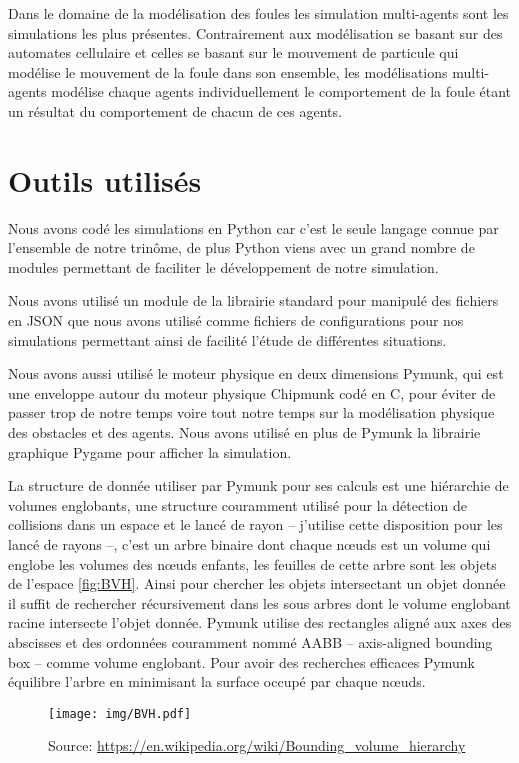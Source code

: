 \documentclass{article}
\newcommand{\source}[1]{\caption*{Source: #1}}
\begin{document}
Dans le domaine de la modélisation des foules les simulation multi-agents sont
les simulations les plus présentes. Contrairement aux modélisation se basant sur
des automates cellulaire et celles se basant sur le mouvement de particule
qui modélise le mouvement de la foule dans son ensemble, les modélisations
multi-agents modélise chaque agents individuellement le comportement de la foule
étant un résultat du comportement de chacun de ces agents.

\section{Outils utilisés}

Nous avons codé les simulations en Python car c'est le seule langage connue
par l'ensemble de notre trinôme, de plus Python viens avec un grand nombre
de modules permettant de faciliter le développement de notre simulation.

Nous avons utilisé un module de la librairie standard pour manipulé des
fichiers en JSON que nous avons utilisé comme
fichiers de configurations pour nos simulations permettant ainsi de facilité
l'étude de différentes situations.

Nous avons aussi utilisé le moteur physique en deux dimensions Pymunk,
qui est une enveloppe autour du moteur physique Chipmunk codé en C, pour
éviter de passer trop de notre temps voire tout notre temps sur la
modélisation physique des obstacles et des agents. Nous avons utilisé en
plus de Pymunk la librairie graphique Pygame pour afficher la simulation.

La structure de donnée utiliser par Pymunk pour ses calculs est une
hiérarchie de volumes englobants, une structure couramment utilisé pour la
détection de collisions dans un espace et le lancé de rayon -- j'utilise
cette disposition pour les lancé de rayons --,
c'est un arbre binaire dont chaque
nœuds est un volume qui englobe les volumes des nœuds enfants, les feuilles
de cette arbre sont les objets de l'espace \autoref{fig:BVH}. Ainsi pour chercher les
objets intersectant un objet donnée il suffit de rechercher récursivement
dans les sous arbres dont le volume englobant racine intersecte l'objet
donnée. Pymunk utilise des rectangles aligné aux axes des abscisses et des
ordonnées couramment nommé AABB -- axis-aligned bounding box -- comme
volume englobant.
Pour avoir des recherches efficaces Pymunk équilibre l'arbre en
minimisant la surface occupé par chaque nœuds.

\begin{figure}[h]
  \texttt{[image: img/BVH.pdf]}
  \caption{Un exemple de BVH}
  \source{\url{https://en.wikipedia.org/wiki/Bounding_volume_hierarchy}}
  \label{fig:BVH}
\end{figure}
\end{document}
